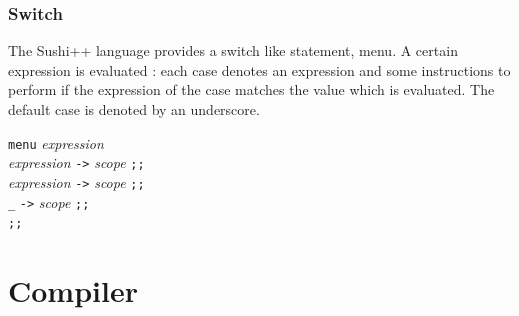 \documentclass[a4paper,11pt]{article}
\begin{document}
\subsubsection{Switch}
The Sushi++ language provides a switch like statement, menu. A certain expression is evaluated : each case denotes an expression and some instructions to perform if the expression of the case matches the value which is evaluated. The default case is denoted by an underscore.
\begin{center}
	\begin{minipage}{0.35\linewidth}
		\texttt{menu} \textit{expression} \\
		\text{ }\text{ }\text{ }\text{ } \textit{expression} \texttt{->} \textit{scope} \texttt{;;} \\
		\text{ }\text{ }\text{ }\text{ } \textit{expression} \texttt{->} \textit{scope} \texttt{;;} \\
		\text{ }\text{ }\text{ }\text{ } \texttt{\_} \texttt{->} \textit{scope} \texttt{;;} \\	
		\texttt{;;}\\
	\end{minipage}
\end{center}
\section{Compiler}
\label{sec:compiler}
\end{document}
